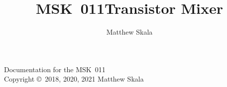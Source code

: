 \documentclass{ncmanual}
\title{MSK~011\quad Transistor Mixer}
\author{Matthew Skala}
\begin{document}
\maketitle


\begin{copyrightpage}
Documentation for the MSK~011\\
Copyright \copyright\ 2018, 2020, 2021 Matthew Skala

\GPLThreeStatement
\end{copyrightpage}

\tableofcontents











\end{document}
